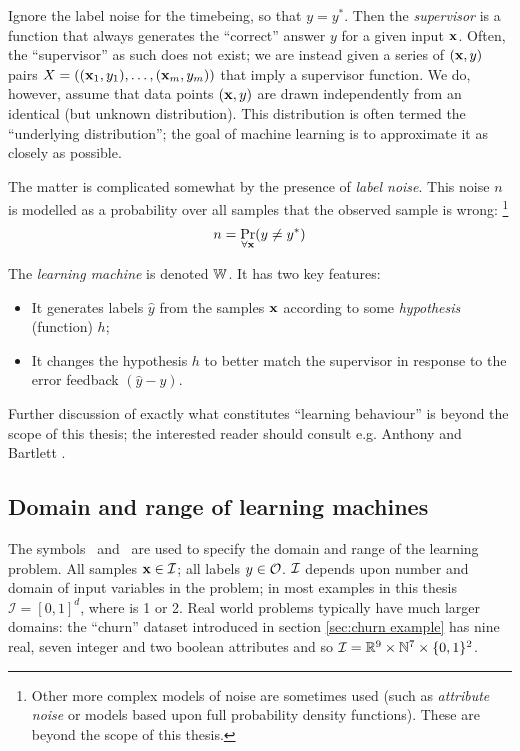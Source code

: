 Ignore the label noise for the timebeing, so that $y = y^{\ast}$.
Then the \emph{supervisor} is a function that always generates the
``correct'' answer $y$ for a given input $\mathbf{x}$.  Often, the
``supervisor'' as such does not exist; we are instead given a series of
$(\mathbf{x}, y)$ pairs $X = ((\mathbf{x}_1, y_1), \ldots, (\mathbf{x}_m, y_m))$ that
imply a supervisor function.  We do, however, assume that data points
$(\mathbf{x}, y)$ are drawn independently from an identical (but unknown
distribution).  This distribution is often termed the ``underlying
distribution''; the goal of machine learning is to approximate it as
closely as possible.

The matter is complicated somewhat by the presence of \emph{label
noise}.  This noise $n$ is modelled as a probability over all samples
that the observed sample is wrong:
\footnote{Other more complex models of noise are sometimes used (such
as \emph{attribute noise} or models based upon full probability
density functions).  These are beyond the scope of this thesis.}
%
\begin{equation}
n = \Pr_{\forall \mathbf{x}}(y \neq y^{\ast})
\end{equation}

\noindent The \emph{learning machine} is denoted $\mathbb{W}$.  It has two key
features:
%
\begin{itemize}
\item	It generates labels $\hat{y}$ from the samples $\mathbf{x}$
	according to some \emph{hypothesis} (function) $h$;
\item	It changes the hypothesis $h$ to better match the supervisor
	in response to the error feedback $(\hat{y} - y)$.
\end{itemize}
%
Further discussion of exactly what constitutes ``learning behaviour''
is beyond the scope of this thesis; the interested reader should
consult e.g. Anthony and Bartlett \cite{Anthony98}.


\subsection{Domain and range of learning machines}
\label{sec:domain and range}

The symbols \calI\ and \calO\ are used to specify the domain and
range of the learning problem.  All samples $\mathbf{x} \in \mathcal{I}$; all
labels $y \in \mathcal{O}$.  $\mathcal{I}$ depends upon number and
domain of input variables in the problem; in most examples in this
thesis $\mathcal{I} = [0,1]^d$, where is 1 or 2.  Real world
problems typically have much larger domains: the ``churn'' dataset
introduced in section \ref{sec:churn example} has nine real, seven
integer and two boolean attributes and so $\mathcal{I} = \mathbb{R}^9 \times \mathbb{N}^7
\times \{0, 1\}^2$.

